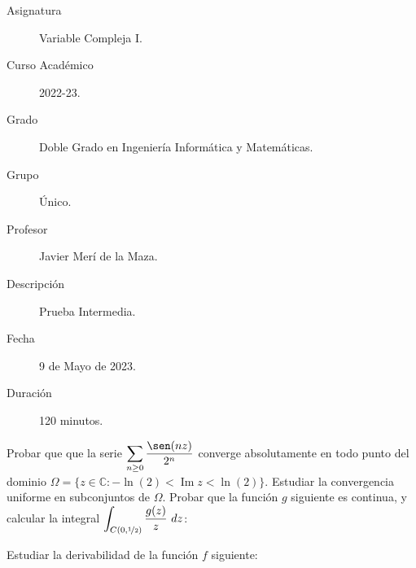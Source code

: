 \documentclass[12pt]{article}
\renewcommand{\Im}{\operatorname{Im}}
\begin{document}

    
    

    \begin{description}
        \item[Asignatura] Variable Compleja I.
        \item[Curso Académico] 2022-23.
        \item[Grado] Doble Grado en Ingeniería Informática y Matemáticas.
        \item[Grupo] Único.
        \item[Profesor] Javier Merí de la Maza.
        \item[Descripción] Prueba Intermedia.
        \item[Fecha] 9 de Mayo de 2023.
        \item[Duración] 120 minutos.
    
    \end{description}
    \newpage

    \begin{ejercicio}[4 puntos]
        Probar que que la serie $\displaystyle \sum_{n\geq 0} \frac{\sen(nz)}{2^n}$ converge absolutamente en todo punto del dominio $\Omega=\{z \in \mathbb{C} : -\ln(2) < \Im z < \ln(2)\}$. Estudiar la convergencia uniforme en subconjuntos de $\Omega$. Probar que la función $g$ siguiente es continua, y calcular la integral $\displaystyle \int_{C(0,\nicefrac{1}{2})} \frac{g(z)}{z}\ dz$:
    \end{ejercicio}

    \begin{ejercicio}[2 puntos]
        Estudiar la derivabilidad de la función $f$ siguiente:
    \end{ejercicio}
\end{document}
